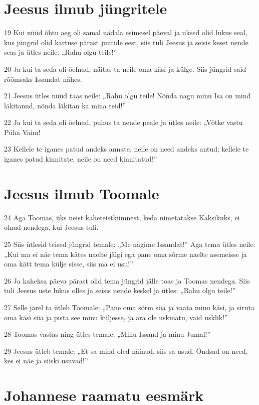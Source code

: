 \section*{Jeesus ilmub jüngritele}

\par 19 Kui nüüd õhtu aeg oli samal nädala esimesel päeval ja uksed olid lukus seal, kus jüngrid olid kartuse pärast juutide eest, siis tuli Jeesus ja seisis keset nende seas ja ütles neile: „Rahu olgu teile!”
\par 20 Ja kui ta seda oli öelnud, näitas ta neile oma käsi ja külge. Siis jüngrid said rõõmsaks Issandat nähes.
\par 21 Jeesus ütles nüüd taas neile: „Rahu olgu teile! Nõnda nagu minu Isa on mind läkitanud, nõnda läkitan ka mina teid!”
\par 22 Ja kui ta seda oli öelnud, puhus ta nende peale ja ütles neile: „Võtke vastu Püha Vaim!
\par 23 Kellele te iganes patud andeks annate, neile on need andeks antud; kellele te iganes patud kinnitate, neile on need kinnitatud!”

\section*{Jeesus ilmub Toomale}

\par 24 Aga Toomas, üks neist kaheteistkümnest, keda nimetatakse Kaksikuks, ei olnud nendega, kui Jeesus tuli.
\par 25 Siis ütlesid teised jüngrid temale: „Me nägime Issandat!” Aga tema ütles neile: „Kui ma ei näe tema kätes naelte jälgi ega pane oma sõrme naelte asemeisse ja oma kätt tema külje sisse, siis ma ei usu!”
\par 26 Ja kaheksa päeva pärast olid tema jüngrid jälle toas ja Toomas nendega. Siis tuli Jeesus uste lukus olles ja seisis nende keskel ja ütles: „Rahu olgu teile!”
\par 27 Selle järel ta ütleb Toomale: „Pane oma sõrm siia ja vaata minu käsi, ja siruta oma käsi siia ja pista see minu küljesse, ja ära ole uskmatu, vaid usklik!”
\par 28 Toomas vastas ning ütles temale: „Minu Issand ja minu Jumal!”
\par 29 Jeesus ütleb temale: „Et sa mind oled näinud, siis sa usud. Õndsad on need, kes ei näe ja siiski usuvad!”

\section*{Johannese raamatu eesmärk}

